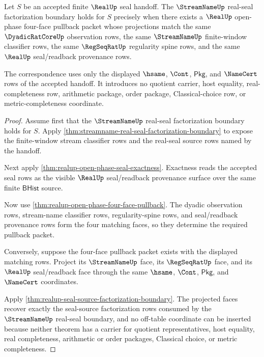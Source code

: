 \begin{theorem}
\label{thm:realup-streamname-factorization-pullback-correspondence}
Let $S$ be an accepted finite $\RealUp$ seal handoff. The
$\StreamNameUp$ real-seal factorization boundary holds for $S$ precisely when
there exists a $\RealUp$ open-phase four-face pullback packet whose projections
match the same $\DyadicRatCoreUp$ observation rows, the same
$\StreamNameUp$ finite-window classifier rows, the same $\RegSeqRatUp$
regularity spine rows, and the same $\RealUp$ seal/readback provenance rows.

The correspondence uses only the displayed $\hsame$, $\Cont$, $\mathsf{Pkg}$,
and $\NameCert$ rows of the accepted handoff. It introduces no quotient
carrier, host equality, real-completeness row, arithmetic package, order
package, Classical-choice row, or metric-completeness coordinate.
\end{theorem}
\begin{proof}
Assume first that the $\StreamNameUp$ real-seal factorization boundary holds
for $S$. Apply
\autoref{thm:streamname-real-seal-factorization-boundary} to expose the
finite-window stream classifier rows and the real-seal source rows named by the
handoff.

Next apply \autoref{thm:realup-open-phase-seal-exactness}. Exactness reads the
accepted seal rows as the visible $\RealUp$ seal/readback provenance surface
over the same finite $\mathsf{BHist}$ source.

Now use \autoref{thm:realup-open-phase-four-face-pullback}. The dyadic
observation rows, stream-name classifier rows, regularity-spine rows, and
seal/readback provenance rows form the four matching faces, so they determine
the required pullback packet.

Conversely, suppose the four-face pullback packet exists with the displayed
matching rows. Project its $\StreamNameUp$ face, its $\RegSeqRatUp$ face, and
its $\RealUp$ seal/readback face through the same $\hsame$, $\Cont$,
$\mathsf{Pkg}$, and $\NameCert$ coordinates.

Apply \autoref{thm:realup-seal-source-factorization-boundary}. The projected
faces recover exactly the seal-source factorization rows consumed by the
$\StreamNameUp$ real-seal boundary, and no off-table coordinate can be inserted
because neither theorem has a carrier for quotient representatives, host
equality, real completeness, arithmetic or order packages, Classical choice, or
metric completeness.
\end{proof}

